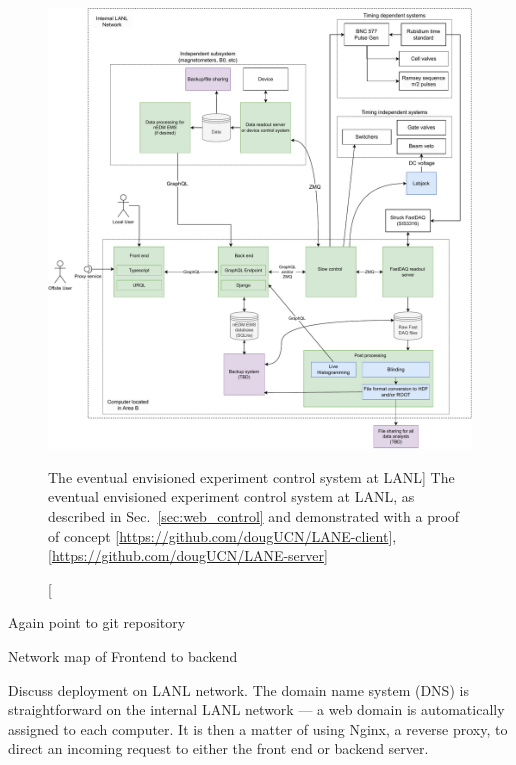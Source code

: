 \begin{figure}
    \centering
    \includegraphics[width=\textwidth]{figures/LANL_nEDM_network.pdf}
    \caption
    [The eventual envisioned experiment control system at LANL]
     {The eventual envisioned experiment control system at LANL, as described in Sec.~\ref{sec:web_control} and demonstrated with a proof of concept [\url{https://github.com/dougUCN/LANE-client}], [\url{https://github.com/dougUCN/LANE-server}]}
    \label{fig:LANL_nEDM_network}
\end{figure}

Again point to git repository

Network map of Frontend to backend

Discuss deployment on LANL network. The domain name system (DNS) is straightforward on the internal LANL network --- a web domain is automatically assigned to each computer. It is then a matter of using Nginx, a reverse proxy, to direct an incoming request to either the front end or backend server. 